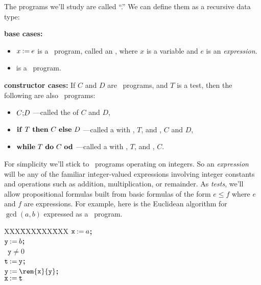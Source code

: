 The programs we'll study are called ``.''  We
can define them as a recursive data type:
\begin{definition}\label{whiledef} \mbox{}

\textbf{base cases:}
\begin{itemize}

\item $x \mathbin{\mathtt{:=}} e$ is a \while\ program, called an , where $x$ is a variable and $e$ is an \emph{expression}.

\item \term{$\halt$} is a \while\ program.

\end{itemize}

\textbf{constructor cases:}
If $C$ and $D$ are \while\ programs, and $T$ is a test, then the following are also
\while\ programs:
\begin{itemize}

\item $C\mathbf{;}D$
---called the  of $C$ and $D$,

\item $\text{\textbf{if}}\ T\ \text{\textbf{then}}\ C\ \text{\textbf{else}}\ D$ ---called a  with
  , $T$, and , $C$ and $D$,

\item $\text{\textbf{while}}\ T\ \text{\textbf{do}}\ C\ \text{\textbf{od}}$
---called a  with , $T$, and , $C$.

\end{itemize}
\end{definition}

For simplicity we'll stick to \while\ programs operating on integers.
So an \emph{expression} will be any of the familiar integer-valued
expressions involving integer constants and operations such as
addition, multiplication, or remainder.
As \emph{tests}, we'll allow propositional formulas built from basic
formulas of the form $e \leq f$ where $e$ and $f$ are expressions.
For example, here is the Euclidean algorithm for $\gcd(a,b)$ expressed
as a \while\ program.
\begin{center}
\begin{tabbing}
XXX\=XXX\=XXX\=XXX\kill
$\mathtt{x} \mathbin{\mathtt{:=}} a$\textbf{;} \\
$\mathtt{y} \mathbin{\mathtt{:=}} b$\textbf{;} \\
\while\ $\mathtt{y} \neq 0$ \docomm\\
   \> $\mathtt{t} \mathbin{\mathtt{:=}} \mathtt{y}$\textbf{;}\\
   \> $\mathtt{y} \assigned \rem{\mathtt{x}}{\mathtt{y}}$\textbf{;}\\
   \> $\mathtt{x} \mathbin{\mathtt{:=}} \mathtt{t}$
\odcomm\\
\end{tabbing}
\end{center}

